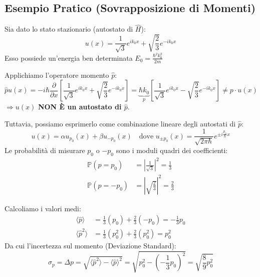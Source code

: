 \documentclass[11pt, a4paper]{article}
\begin{document}
\subsection{Esempio Pratico (Sovrapposizione di Momenti)} %

Sia dato lo stato stazionario (autostato di $\hat{H}$): %
\begin{equation*}
    u(x) = \frac{1}{\sqrt{3}} e^{ik_0 x} + \sqrt{\frac{2}{3}} e^{-ik_0 x} %
\end{equation*}
Esso possiede un'energia ben determinata $E_0 = \frac{\hbar^2 k_0^2}{2m}$ %

\noindent
Applichiamo l'operatore momento $\hat{p}$: %
\begin{equation*}
    \hat{p} u(x) = -i\hbar \frac{\partial}{\partial x} \left[ \frac{1}{\sqrt{3}} e^{ik_0 x} + \sqrt{\frac{2}{3}} e^{-ik_0 x} \right] = \underbrace{\hbar k_0}_{p} \left[ \frac{1}{\sqrt{3}} e^{ik_0 x} - \sqrt{\frac{2}{3}} e^{-ik_0 x} \right] \neq p \cdot u(x) %
\end{equation*}
$\Rightarrow u(x)$ \textbf{NON È un autostato di $\hat{p}$}. %

\noindent
Tuttavia, possiamo esprimerlo come combinazione lineare degli autostati di $\hat{p}$: %
\begin{equation*}
    u(x) = \alpha u_{p_0}(x) + \beta u_{-p_0}(x) \quad \text{dove } u_{\pm p_0}(x) = \frac{1}{\sqrt{2\pi\hbar}} e^{\pm i\frac{p_0}{\hbar}x} %
\end{equation*}
Le probabilità di misurare $p_0$ o $-p_0$ sono i moduli quadri dei coefficienti: %
\begin{align*}
    \mathbb{P}(p = p_0) &= \left| \frac{1}{\sqrt{3}} \right|^2 = \frac{1}{3} \\ %
    \mathbb{P}(p = -p_0) &= \left| \sqrt{\frac{2}{3}} \right|^2 = \frac{2}{3} %
\end{align*}

\noindent
Calcoliamo i valori medi: %
\begin{align*}
    \langle \hat{p} \rangle &= \frac{1}{3}(p_0) + \frac{2}{3}(-p_0) = -\frac{1}{3} p_0 \\ %
    \langle \hat{p}^2 \rangle &= \frac{1}{3}(p_0^2) + \frac{2}{3}(p_0^2) = p_0^2 %
\end{align*}
Da cui l'incertezza sul momento (Deviazione Standard): %
\begin{equation}
    \sigma_p = \Delta p = \sqrt{ \langle \hat{p}^2 \rangle - \langle \hat{p} \rangle^2 } = \sqrt{ p_0^2 - \left(-\frac{1}{3}p_0\right)^2 } = \sqrt{ \frac{8}{9} p_0^2 } %
\end{equation}
\end{document}
